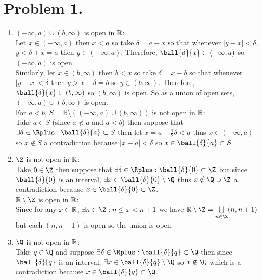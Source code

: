 \documentclass[12pt]{extarticle}
\begin{document}
 
\section*{Problem 1.}
 
\begin{enumerate}
\item $(-\infty ,  a) \cup (b, \infty)$ is open in $\mathbb{R}$: \\
Let $ x \in (-\infty, a)$ then $x < a$ so take $\delta = a - x$ so that whenever $|y - x| < \delta$, $y < \delta + x = a$ then $y \in (- \infty, a)$. Therefore, $\ball{\delta}{x} \subset (-\infty, a)$ so $(-\infty, a)$ is open. \\

Similarly, let $ x \in (b, \infty)$ then $b < x$ so take $\delta = x - b$ so that whenever $|y - x| < \delta$ then $y > x - \delta = b$ so $y \in (b, \infty)$. Therefore, $\ball{\delta}{x} \subset (b, \infty)$ so $(b, \infty)$ is open. So as a union of open sets, $(-\infty ,  a) \cup (b, \infty)$ is open. \\

For $a < b$, $S = \mathbb{R} \setminus ((-\infty ,  a) \cup (b, \infty))$ is not open in $\mathbb{R}$: \\ Take $a \in S$ (since $a \nless a$ and $a < b$) then suppose that $\exists \delta \in \Rplus : \ball{\delta}{a} \subset S$ then let $x = a - \frac{1}{2}\delta < a$ thus $x \in (-\infty, a)$ so $x \notin S$  a contradiction because $|x - a| < \delta$ so $x \in \ball{\delta}{a} \subset S$. 
\item $\Z$ is not open in $\mathbb{R}$: \\
Take $0 \in \Z$ then suppose that $\exists \delta \in \Rplus : \ball{\delta}{0} \subset \Z$ but since $\ball{\delta}{0}$ is an interval, $\exists x \in \ball{\delta}{0} \setminus \Q$ thus $x \notin \Q \supset \Z$  a contradiction because $x \in \ball{\delta}{0} \subset \Z$.
\\

$\R \setminus \Z$ is open in $\mathbb{R}$: \\
Since for any $x \in \mathbb{R}$, $\exists n \in \Z : n \leq x < n + 1$ we have $\R \setminus \Z = \bigcup\limits_{n \in \Z} (n, n + 1)$ but each $(n, n + 1)$ is open so the union is open.

\item $\Q$ is not open in $\mathbb{R}$: \\
Take $q \in \Q$ and suppose $\exists \delta \in \Rplus : \ball{\delta}{q} \subset \Q$ then since $\ball{\delta}{q}$ is an interval, $\exists x \in \ball{\delta}{q} \setminus \Q$ so $x \notin \Q$ which is a contradiction because $x \in \ball{\delta}{q} \subset \Q$.  \\


\end{enumerate}
\end{document}
